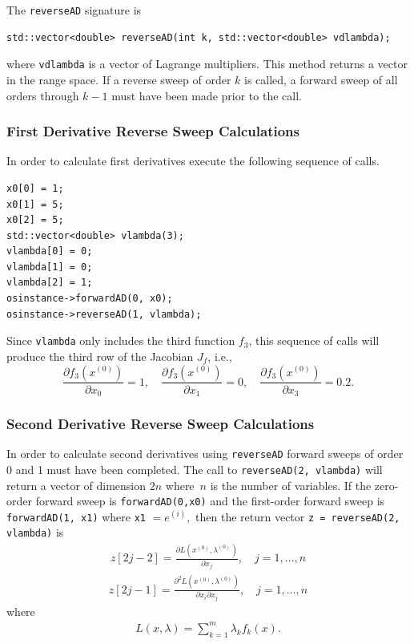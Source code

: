 \documentclass[11pt]{article}
\newcommand{\D}[2]{ \frac{\partial #1}{\partial #2} }
\newcommand{\DD}[3]{ \frac{\partial^2 #1}{\partial #2 \partial #3} }
\renewcommand{\_}{{\char"5F}}
\renewcommand{\{}{{\char"7B}}
\renewcommand{\}}{{\char"7D}}
\renewcommand{\^}{{\char"0D}}
\renewcommand{\'}{{\char"0D}}
\begin{document}
\begin{enumerate}[Step 1:]
The {\tt reverseAD} signature is
\begin{verbatim}
std::vector<double> reverseAD(int k, std::vector<double> vdlambda);
\end{verbatim}
where {\tt vdlambda} is a vector of Lagrange multipliers.  This method returns a vector in the range space. If a reverse sweep of order $k$ is called, a forward sweep of all orders  through  $k -1$ must have been made prior to the call.

\subsubsection{First Derivative Reverse Sweep Calculations}

In order to calculate first derivatives execute the following sequence of calls.
\begin{verbatim}
x0[0] = 1;
x0[1] = 5;
x0[2] = 5;
std::vector<double> vlambda(3);
vlambda[0] = 0;
vlambda[1] = 0;
vlambda[2] = 1;
osinstance->forwardAD(0, x0);
osinstance->reverseAD(1, vlambda);
\end{verbatim}
Since {\tt vlambda} only includes
the third function $f_3$, this sequence of calls will produce the third row of the
Jacobian $J_f$, i.e.,
$$
\D{f_{3}(x^{(0)})}{x_{0}}  = 1,  \quad \D{f_{3}(x^{(0)})}{x_{1}}  = 0, \quad  \D{f_{3}(x^{(0)})}{x_{3}}  = 0.2.
$$

\subsubsection{Second Derivative Reverse Sweep Calculations}

In order to calculate second derivatives using {\tt reverseAD} forward sweeps of order 0 and 1 must have been 
completed.  The call to {\tt reverseAD(2, vlambda)} will return a vector of dimension $2n$ where~$n$ is the 
number of variables.  If the zero-order forward sweep is {\tt forwardAD(0,x0)} and the first-order forward 
sweep is {\tt forwardAD(1, x1)} where {\tt x1} $= e^{(i)},$ then the return vector 
{\tt z = reverseAD(2,  vlambda)} is
\begin{eqnarray}
z[2j - 2]  = \D{L (x^{(0)}, \lambda^{(0)})}{x_{j}}, \quad j = 1, \ldots, n
\end{eqnarray}
\begin{eqnarray}
z[2j - 1]  = \DD{L(x^{(0)}, \lambda^{(0)})}{x_{i}}{x_{j}}, \quad j = 1, \ldots, n
\end{eqnarray}
where
\begin{eqnarray}
L (x, \lambda) = \sum_{k = 1}^{m} \lambda_{k} f_{k}(x).
\end{eqnarray}




\end{enumerate}
\end{document}
